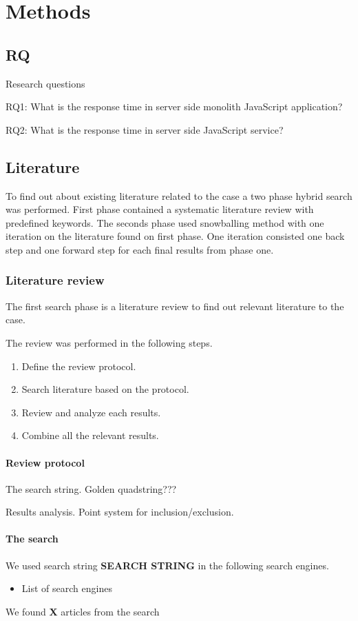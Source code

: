 \chapter{Methods\label{methods}}

\section{RQ}

Research questions

RQ1: What is the response time in server side monolith JavaScript application?

RQ2: What is the response time in server side JavaScript service?

\section{Literature}
To find out about existing literature related to the case a two phase hybrid search was performed.
First phase contained a systematic literature review with predefined keywords.
The seconds phase used snowballing method with one iteration on the literature found on first phase.
One iteration consisted one back step and one forward step for each final results from phase one.

\subsection{Literature review}
The first search phase is a literature review to find out relevant literature to the case.

The review was performed in the following steps.
\begin{enumerate}
    \item Define the review protocol.
    \item Search literature based on the protocol.
    \item Review and analyze each results.
    \item Combine all the relevant results.
\end{enumerate}

\subsubsection{Review protocol}
The search string.
Golden quadstring???

Results analysis.
Point system for inclusion/exclusion.


\subsubsection{The search}
We used search string \textbf{SEARCH STRING} in the following search engines.
\begin{itemize}
    \item List of search engines
\end{itemize}
We found \textbf{X} articles from the search

